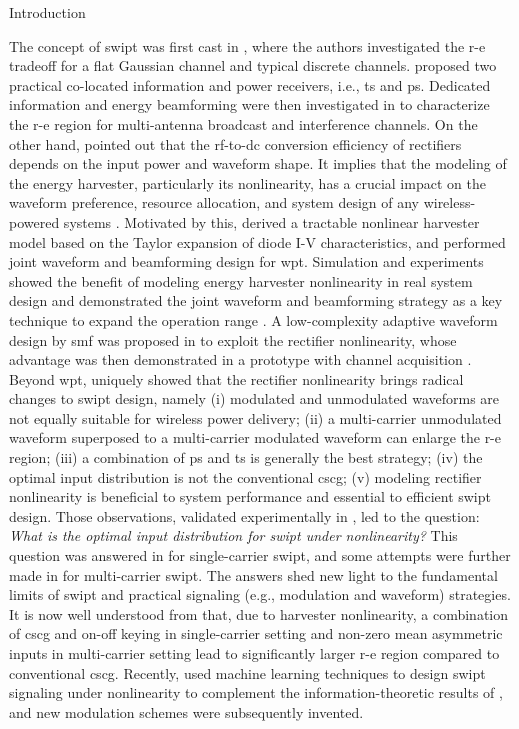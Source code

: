 \begin{section}{Introduction}
\begin{subsection}{}
		The concept of \gls{swipt} was first cast in \cite{Varshney2008}, where the authors investigated the \gls{r-e} tradeoff for a flat Gaussian channel and typical discrete channels. \cite{Zhou2013} proposed two practical co-located information and power receivers, i.e., \gls{ts} and \gls{ps}. Dedicated information and energy beamforming were then investigated in \cite{Zhang2013,Park2014} to characterize the \gls{r-e} region for multi-antenna broadcast and interference channels. On the other hand, \cite{Trotter2009} pointed out that the \gls{rf}-to-\gls{dc} conversion efficiency of rectifiers depends on the input power and waveform shape. It implies that the modeling of the energy harvester, particularly its nonlinearity, has a crucial impact on the waveform preference, resource allocation, and system design of any wireless-powered systems \cite{Trotter2009,Clerckx2018,Clerckx2019}. Motivated by this, \cite{Clerckx2016a} derived a tractable nonlinear harvester model based on the Taylor expansion of diode I-V characteristics, and performed joint waveform and beamforming design for \gls{wpt}. Simulation and experiments showed the benefit of modeling energy harvester nonlinearity in real system design \cite{Kim2019,Kim2020a} and demonstrated the joint waveform and beamforming strategy as a key technique to expand the operation range \cite{Kim2021}. A low-complexity adaptive waveform design by \gls{smf} was proposed in \cite{Clerckx2017} to exploit the rectifier nonlinearity, whose advantage was then demonstrated in a prototype with channel acquisition \cite{Kim2017}. Beyond \gls{wpt}, \cite{Clerckx2018b} uniquely showed that the rectifier nonlinearity brings radical changes to \gls{swipt} design, namely (i) modulated and unmodulated waveforms are not equally suitable for wireless power delivery; (ii) a multi-carrier unmodulated waveform superposed to a multi-carrier modulated waveform can enlarge the \gls{r-e} region; (iii) a combination of \gls{ps} and \gls{ts} is generally the best strategy; (iv) the optimal input distribution is not the conventional \gls{cscg}; (v) modeling rectifier nonlinearity is beneficial to system performance and essential to efficient \gls{swipt} design. Those observations, validated experimentally in \cite{Kim2019}, led to the question: \emph{What is the optimal input distribution for \gls{swipt} under nonlinearity?} This question was answered in \cite{Varasteh2020} for single-carrier \gls{swipt}, and some attempts were further made in \cite{Varasteh2019d} for multi-carrier \gls{swipt}. The answers shed new light to the fundamental limits of \gls{swipt} and practical signaling (e.g., modulation and waveform) strategies. It is now well understood from \cite{Clerckx2018b,Varasteh2020,Varasteh2019d} that, due to harvester nonlinearity, a combination of \gls{cscg} and on-off keying in single-carrier setting and non-zero mean asymmetric inputs in multi-carrier setting lead to significantly larger \gls{r-e} region compared to conventional \gls{cscg}. Recently, \cite{Varasteh2020a} used machine learning techniques to design \gls{swipt} signaling under nonlinearity to complement the information-theoretic results of \cite{Varasteh2020}, and new modulation schemes were subsequently invented.

\end{subsection}
\end{section}
